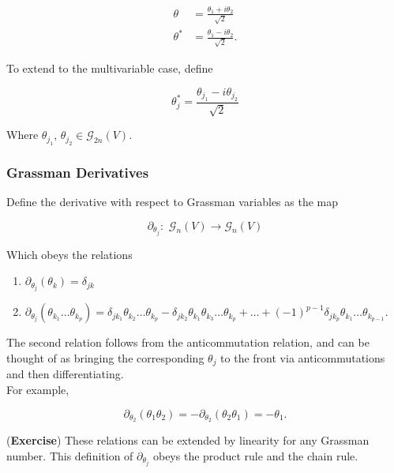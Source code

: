 \begin{align}
\theta &= \frac{\theta_1 + i \theta_2}{\sqrt{2}} \\
\theta^* &= \frac{\theta_1 - i \theta_2}{\sqrt{2}}.
\end{align}

\noindent To extend to the multivariable case, define

\begin{equation}
\theta_j^* = \frac{\theta_{j_1} - i \theta_{j_2}}{\sqrt{2}}
\end{equation}

\noindent Where $\theta_{j_1}, \, \theta_{j_2} \in \mathcal{G}_{2n} (V)$.

\subsubsection*{Grassman Derivatives}

\noindent Define the derivative with respect to Grassman variables as the map

\begin{equation}
\partial_{\theta_j} : \,\, \mathcal{G}_n (V) \rightarrow \mathcal{G}_n (V)
\end{equation}

\noindent Which obeys the relations

\begin{enumerate}
\item $\partial_{\theta_j} (\theta_k) = \delta_{jk}$
\item $\partial_{\theta_j} (\theta_{k_1} \dots \theta_{k_p}) = \delta_{j k_1} \theta_{k_2} \dots \theta_{k_p} - \delta_{j k_2} \theta_{k_1} \theta_{k_3} \dots \theta_{k_p} + \dots + (-1)^{p-1} \delta_{j k_p} \theta_{k_1} \dots \theta_{k_{p-1}}$.
\end{enumerate}

\noindent The second relation follows from the anticommutation relation, and can be thought of as bringing the corresponding $\theta_j$ to the front via anticommutations and then differentiating. \\
\noindent For example,

\begin{equation}
\partial_{\theta_2} (\theta_1 \theta_2 ) = - \partial_{\theta_2} (\theta_2 \theta_1) = - \theta_1.
\end{equation}

\noindent (\textbf{Exercise}) These relations can be extended by linearity for any Grassman number. This definition of $\partial_{\theta_j}$ obeys the product rule and the chain rule.


